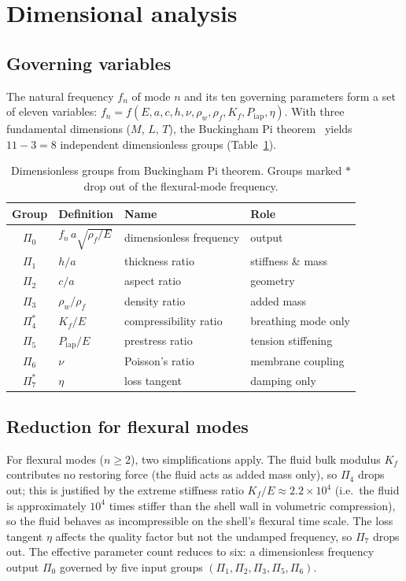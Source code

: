 \documentclass[review]{elsarticle}
\begin{document}
\section{Dimensional analysis}
\label{sec:method}

\subsection{Governing variables}

The natural frequency $f_n$ of mode $n$ and its ten governing parameters
form a set of eleven variables:
$f_n = f(E, a, c, h, \nu, \rho_w, \rho_f, K_f, P_\mathrm{iap}, \eta)$.
With three fundamental dimensions ($M$, $L$, $T$), the Buckingham Pi
theorem~\cite{Buckingham1914} yields $11 - 3 = 8$ independent
dimensionless groups (Table~\ref{tab:pi_groups}).

\begin{table}[htbp]
  \centering
  \caption{Dimensionless groups from Buckingham Pi theorem.  Groups marked
  $\ast$ drop out of the flexural-mode frequency.}
  \label{tab:pi_groups}
  \begin{tabular}{clll}
    \toprule
    Group & Definition & Name & Role \\
    \midrule
    $\Pi_0$ & $f_n\, a\sqrt{\rho_f/E}$ & dimensionless frequency & output \\
    $\Pi_1$ & $h/a$ & thickness ratio & stiffness \& mass \\
    $\Pi_2$ & $c/a$ & aspect ratio & geometry \\
    $\Pi_3$ & $\rho_w/\rho_f$ & density ratio & added mass \\
    $\Pi_4^\ast$ & $K_f/E$ & compressibility ratio & breathing mode only \\
    $\Pi_5$ & $P_\mathrm{iap}/E$ & prestress ratio & tension stiffening \\
    $\Pi_6$ & $\nu$ & Poisson's ratio & membrane coupling \\
    $\Pi_7^\ast$ & $\eta$ & loss tangent & damping only \\
    \bottomrule
  \end{tabular}
\end{table}

\subsection{Reduction for flexural modes}

For flexural modes ($n \ge 2$), two simplifications apply.  The fluid bulk
modulus $K_f$ contributes no restoring force (the fluid acts as added mass
only), so $\Pi_4$ drops out; this is justified by the extreme stiffness
ratio $K_f/E \approx 2.2 \times 10^4$ (i.e.\ the fluid is approximately
$10^4$ times stiffer than the shell wall in volumetric compression), so the
fluid behaves as incompressible on the shell's flexural time scale.  The
loss tangent $\eta$ affects the quality
factor but not the undamped frequency, so $\Pi_7$ drops out.  The effective
parameter count reduces to six: a dimensionless frequency output $\Pi_0$
governed by five input groups $(\Pi_1, \Pi_2, \Pi_3, \Pi_5, \Pi_6)$.
\end{document}

